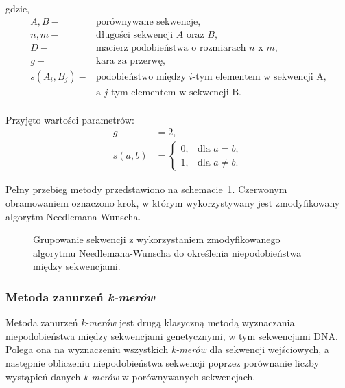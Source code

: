             gdzie,
            \begin{align*} 
                A, B -& \text{porównywane sekwencje}, \\
                n, m -& \text{długości sekwencji } A \text{ oraz } B, \\
                D -& \text{macierz podobieństwa o rozmiarach } n \text{ x } m, \\
                g -& \text{kara za przerwę}, \\
                s(A_i, B_j) -& \text{podobieństwo między  } i\text{-tym elementem w sekwencji A,} \\ 
                & \text{a } j \text{-tym elementem w sekwencji B}. \\
            \end{align*}

            Przyjęto wartości parametrów:
            \begin{align*}
                g &= 2, \\
                s(a, b) &= \begin{cases}
                    0, & \text{dla } a = b, \\
                    1, & \text{dla } a \neq b.
                \end{cases}
            \end{align*}

            Pełny przebieg metody przedstawiono na schemacie~\ref{Picture:Cluster:NeedlemanWunsch}. Czerwonym obramowaniem oznaczono krok, w którym wykorzystywany jest zmodyfikowany algorytm Needlemana-Wunscha.


            \begin{figure}
                \begin{center}
                    
                \end{center}
                \caption{
                    Grupowanie sekwencji z wykorzystaniem zmodyfikowanego algorytmu Needlemana-Wunscha do określenia niepodobieństwa między sekwencjami.
                }\label{Picture:Cluster:NeedlemanWunsch}
            \end{figure}

        \subsubsection{Metoda zanurzeń \textit{k-merów}}
            Metoda zanurzeń \textit{k-merów} jest drugą klasyczną metodą wyznaczania niepodobieństwa między sekwencjami genetycznymi, w tym sekwencjami DNA. Polega ona na wyznaczeniu wszystkich \textit{k-merów} dla sekwencji wejściowych, a następnie obliczeniu niepodobieństwa sekwencji poprzez porównanie liczby wystąpień danych \textit{k-merów} w porównywanych sekwencjach.

